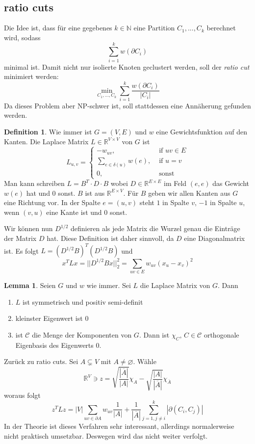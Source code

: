 \documentclass[a4paper, 12pt]{article}
\theoremstyle{plain}
\theoremstyle{definition}
\newtheorem{definition}[theorem]{Definition} %
\theoremstyle{lemma}
\newtheorem{lemma}[theorem]{Lemma}
\theoremstyle{remark}
\theoremstyle{corollary}
\theoremstyle{example}
\begin{document}
	\subsection{ratio cuts}
	Die Idee ist, dass für eine gegebenes $k \in \mathbb{N}$ eine Partition $C_1,...,C_k$ berechnet wird, sodass \[\sum_{i=1}^{k} w(\partial C_i)\] minimal ist. Damit nicht nur isolierte Knoten geclustert werden, soll der \textit{ratio cut} minimiert werden: \[\min_{C_1,...,C_k} \sum_{i=1}^k \frac{w(\partial C_i)}{\left|C_i\right|}\] Da dieses Problem aber NP-schwer ist, soll stattdessen eine Annäherung gefunden werden.
	\begin{definition}
		Wie immer ist $G=(V,E)$ und $w$ eine Gewichtsfunktion auf den Kanten. Die Laplace Matrix $L \in \mathbb{R}^{V\times V}$ von $G$ ist \[L_{u,v} = \begin{cases}
			-w_{uv}, & \text{ if } uv \in E\\
			\sum_{e \in \delta(u)} w(e), & \text{ if } u=v\\
			0, & \text{ sonst}
		\end{cases}\]
		Man kann schreiben $L = B^T\cdot D \cdot B$ wobei $D \in \mathbb{R}^{E \times E}$ im Feld $(e,e)$ das Gewicht $w(e)$ hat und 0 sonst. $B$ ist aus $\mathbb{R}^{E \times V}$. Für $B$ geben wir allen Kanten aus $G$ eine Richtung vor. In der Spalte $e = (u,v)$ steht $1$ in Spalte $v$, $-1$ in Spalte $u$, wenn $(v,u)$ eine Kante ist und 0 sonst.
	\end{definition}
	Wir können nun $D^{1/2}$ definieren als jede Matrix die Wurzel genau die Einträge der Matrix $D$ hat. Diese Definition ist daher sinnvoll, da $D$ eine Diagonalmatrix ist. Es folgt $L = (D^{1/2}B)^T(D^{1/2}B)$ und \[x^T L x = ||D^{1/2}Bx||_2^2 = \sum_{uv \in E} w_{uv}(x_u-x_v)^2\]
	\begin{lemma}
		Seien $G$ und $w$ wie immer. Sei $L$ die Laplace Matrix von $G$. Dann \begin{enumerate}
			\item $L$ ist symmetrisch und positiv semi-definit
			\item kleinster Eigenwert ist 0
			\item ist $\mathcal{C}$ die Menge der Komponenten von $G$. Dann ist $\chi_C, \, C \in \mathcal{C}$ orthogonale Eigenbasis des Eigenwerts 0.
		\end{enumerate}
	\end{lemma}
	Zurück zu ratio cuts. Sei $A \subsetneq V$ mit $A\neq \varnothing$. Wähle \[\mathbb{R}^V \ni z = \sqrt{\frac{\left|\overline{A}\right|}{\left|A\right|}} \chi_A - \sqrt{\frac{\left|A\right|}{\left|\overline{A}\right|}}\chi_{\overline{A}}\] woraus folgt \[z^TLz = \left|V\right|\sum_{uv \in \partial A} w_{uv}\frac{1}{\left|A\right|} + \frac{1}{\left|\overline A\right|}\sum_{j=1, j\neq i}^k \left|\partial(C_i,C_j)\right|\] In der Theorie ist dieses Verfahren sehr interessant, allerdings normalerweise nicht praktisch umsetzbar. Deswegen wird das nicht weiter verfolgt.
\end{document}
